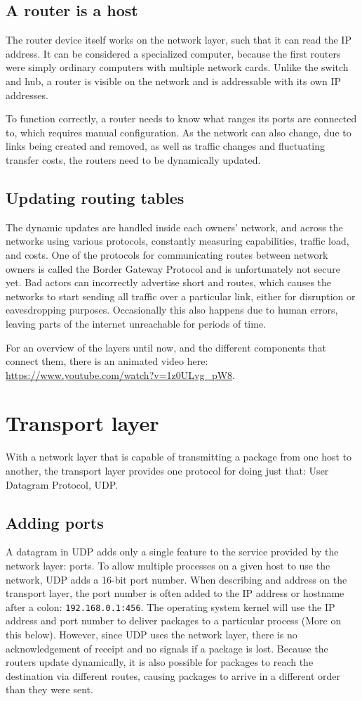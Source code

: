 \subsection{A router is a host}
The router device itself works on the network layer, such that it can read the IP address. It can be considered a specialized computer, because the first routers were simply ordinary computers with multiple network cards. Unlike the switch and hub, a router is visible on the network and is addressable with its own IP addresses.

To function correctly, a router needs to know what ranges its ports are connected to, which requires manual configuration. As the network can also change, due to links being created and removed, as well as traffic changes and fluctuating transfer costs, the routers need to be dynamically updated.

\subsection{Updating routing tables}
The dynamic updates are handled inside each owners’ network, and across the networks using various protocols, constantly measuring capabilities, traffic load, and costs. One of the protocols for communicating routes between network owners is called the Border Gateway Protocol and is unfortunately not secure yet. Bad actors can incorrectly advertise short and routes, which causes the networks to start sending all traffic over a particular link, either for disruption or eavesdropping purposes. Occasionally this also happens due to human errors, leaving parts of the internet unreachable for periods of time.

For an overview of the layers until now, and the different components that connect them, there is an animated video here: \url{https://www.youtube.com/watch?v=1z0ULvg_pW8}.

\section{Transport layer}
With a network layer that is capable of transmitting a package from one host to another, the transport layer provides one protocol for doing just that: User Datagram Protocol, UDP.

\subsection{Adding ports}
A datagram in UDP adds only a single feature to the service provided by the network layer: ports. To allow multiple processes on a given host to use the network, UDP adds a 16-bit port number. When describing and address on the transport layer, the port number is often added to the IP address or hostname after a colon: \texttt{192.168.0.1:456}. The operating system kernel will use the IP address and port number to deliver packages to a particular process (More on this below). However, since UDP uses the network layer, there is no acknowledgement of receipt and no signals if a package is lost. Because the routers update dynamically, it is also possible for packages to reach the destination via different routes, causing packages to arrive in a different order than they were sent.

